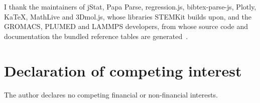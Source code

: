 \documentclass[11pt,a4paper]{article}
\begin{document}
I thank the maintainers of jStat, Papa Parse, regression.js, bibtex-parse-js,
Plotly, KaTeX, MathLive and 3Dmol.js, whose libraries STEMKit builds upon, and
the GROMACS, PLUMED and LAMMPS developers, from whose source code and
documentation the bundled reference tables are
generated~\cite{abraham2015,tribello2014,plumed2019,thompson2022}.

\section*{Declaration of competing interest}

The author declares no competing financial or non-financial interests.

\end{document}
